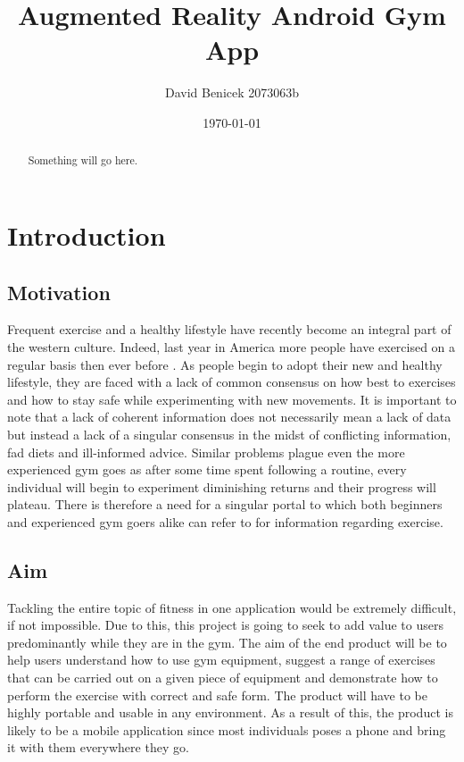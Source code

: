 \documentclass{l4proj}
\begin{document}
\title{Augmented Reality Android Gym App}
\author{David Benicek 2073063b}
\date{\today}
\maketitle

\begin{abstract}
Something will go here.
\end{abstract}

\educationalconsent
%
%
\tableofcontents

\chapter{Introduction}
\section{Motivation}
Frequent exercise and a healthy lifestyle have recently become an integral part of the western culture. Indeed, last year in America more people have exercised on a regular basis then ever before \cite{riffkin_so_2015}. As people begin to adopt their new and healthy lifestyle, they are faced with a lack of common consensus on how best to exercises and how to stay safe while experimenting with new movements. It is important to note that a lack of coherent information does not necessarily mean a lack of data but instead a lack of a singular consensus in the midst of conflicting information, fad diets and ill-informed advice. Similar problems plague even the more experienced gym goes as after some time spent following a routine, every individual will begin to experiment diminishing returns and their progress will plateau. There is therefore a need for a singular portal to which both beginners and experienced gym goers alike can refer to for information regarding exercise.  

\section{Aim} \label{sec:aim}
Tackling the entire topic of fitness in one application would be extremely difficult, if not impossible. Due to this, this project is going to seek to add value to users predominantly while they are in the gym. The aim of the end product will be to help users understand how to use gym equipment, suggest a range of exercises that can be carried out on a given piece of equipment and demonstrate how to perform the exercise with correct and safe form. The product will have to be highly portable and usable in any environment. As a result of this, the product is likely to be a mobile application since most individuals poses a phone and bring it with them everywhere they go.
\end{document}
